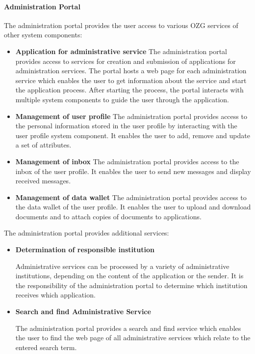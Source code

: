 \documentclass[
     12pt,         %
     a4paper,      %
     BCOR=10mm,version=first,     %
     DIV=14,version=first,        %
     ]{scrreprt}
\begin{document}
\paragraph{Administration Portal}
The administration portal provides the user access to various OZG services of other system components:

\begin{itemize}

    \item \textbf{Application for administrative service}
    The administration portal provides access to services for creation and submission of applications for administration services. The portal hosts a web page for each administration service which enables the user to get information about the service and start the application process. After starting the process, the portal interacts with multiple system components to guide the user through the application.
    
    \item \textbf{Management of user profile}
    The administration portal provides access to the personal information stored in the user profile by interacting with the user profile system component. It enables the user to add, remove and update a set of attributes.
    
    \item \textbf{Management of inbox}
    The administration portal provides access to the inbox of the user profile. It enables the user to send new messages and display received messages.
    
    \item \textbf{Management of data wallet}
    The administration portal provides access to the data wallet of the user profile. It enables the user to upload and download documents and to attach copies of documents to applications.
    
\end{itemize}

The administration portal provides additional services:

\begin{itemize}
    \item \textbf{Determination of responsible institution}
    
    Administrative services can be processed by a variety of administrative institutions, depending on the content of the application or the sender. It is the responsibility of the administration portal to determine which institution receives which application.
    
    \item \textbf{Search and find Administrative Service}
    
    The administration portal provides a search and find service which enables the user to find the web page of all administrative services which relate to the entered search term.

\end{itemize}
\end{document}
